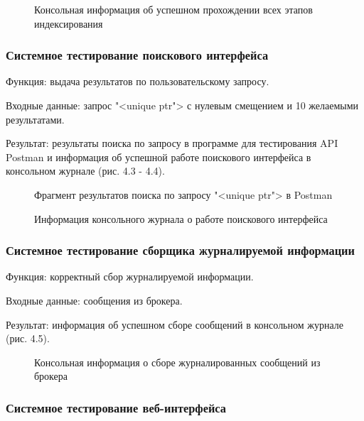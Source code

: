 \begin{figure}[H]
\caption{Консольная информация об успешном прохождении всех этапов индексирования}
\label{tests/indexer.png:image}
\end{figure}

\subsubsection{Системное тестирование поискового интерфейса}

Функция: выдача результатов по пользовательскому запросу.

Входные данные: запрос "<unique ptr"> с нулевым смещением и 10 желаемыми результатами.

Результат: результаты поиска по запросу в программе для тестирования API Postman и информация об успешной работе поискового интерфейса в консольном журнале (рис. 4.3 - 4.4).

\begin{figure}[H]
\caption{Фрагмент результатов поиска по запросу "<unique ptr"> в Postman}
\label{tests/searcher_results.png:image}
\end{figure}

\begin{figure}[H]
\caption{Информация консольного журнала о работе поискового интерфейса}
\label{tests/searcher_logs.png:image}
\end{figure}

\subsubsection{Системное тестирование сборщика журналируемой информации}

Функция: корректный сбор журналируемой информации.

Входные данные: сообщения из брокера.

Результат: информация об успешном сборе сообщений в консольном журнале (рис. 4.5).

\begin{figure}[H]
\caption{Консольная информация о сборе журналированных сообщений из брокера}
\label{tests/logger.png:image}
\end{figure}

\subsubsection{Системное тестирование веб-интерфейса}

